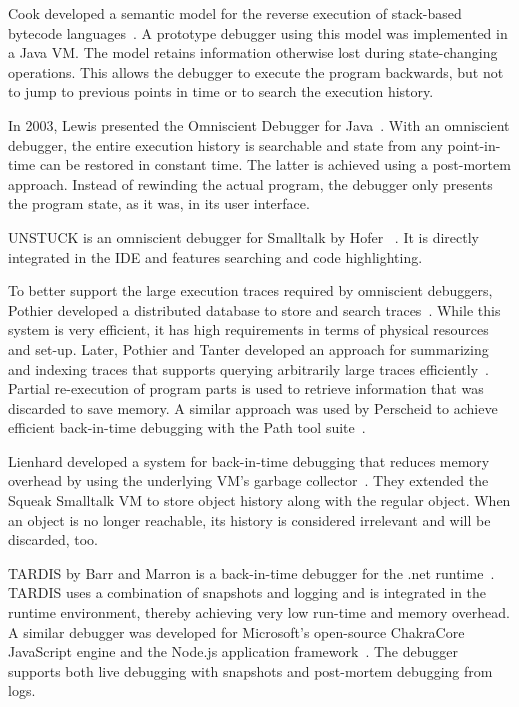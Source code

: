 Cook developed a semantic model for the reverse execution of stack-based bytecode languages~\cite{cook02:reverse_execution_of_java}.
A prototype debugger using this model was implemented in a Java VM.
The model retains information otherwise lost during state-changing operations.
This allows the debugger to execute the program backwards, but not to jump to previous points in time or to search the execution history.

In 2003, Lewis presented the Omniscient Debugger for Java~\cite{lewis03:debugging_backwards_in_time}.
With an omniscient debugger, the entire execution history is searchable and state from any point-in-time can be restored in constant time.
The latter is achieved using a post-mortem approach.
Instead of rewinding the actual program, the debugger only presents the program state, as it was, in its user interface.

UNSTUCK is an omniscient debugger for Smalltalk by Hofer \etal~\cite{hofer06:design_and_implementation}.
It is directly integrated in the IDE and features searching and code highlighting.

To better support the large execution traces required by omniscient debuggers, Pothier \etal developed a distributed database to store and search traces~\cite{pothier07:scalable_omniscient_debugging}.
While this system is very efficient, it has high requirements in terms of physical resources and set-up.
Later, Pothier and Tanter developed an approach for summarizing and indexing traces that supports querying arbitrarily large traces efficiently~\cite{pothier11:summarized_trace_indexing}.
Partial re-execution of program parts is used to retrieve information that was discarded to save memory.
A similar approach was used by Perscheid to achieve efficient back-in-time debugging with the Path tool suite~\cite{perscheid10:immediacy_through_interactivity_onlinea, perscheid13:test-driven_fault_navigation}.

Lienhard \etal developed a system for back-in-time debugging that reduces memory overhead by using the underlying VM's garbage collector~\cite{lienhard08:practical_object-oriented_back-in-time_debugging}.
They extended the Squeak Smalltalk VM to store object history along with the regular object.
When an object is no longer reachable, its history is considered irrelevant and will be discarded, too.

TARDIS by Barr and Marron is a back-in-time debugger for the .net runtime~\cite{barr14:tardis_affordable_time-travel_debugging}.
TARDIS uses a combination of snapshots and logging and is integrated in the runtime environment, thereby achieving very low run-time and memory overhead.
A similar debugger was developed for Microsoft’s open-source ChakraCore JavaScript engine and the Node.js application framework~\cite{barr16:time-travel_debugging_for_javascriptnode}.
The debugger supports both live debugging with snapshots and post-mortem debugging from logs.

